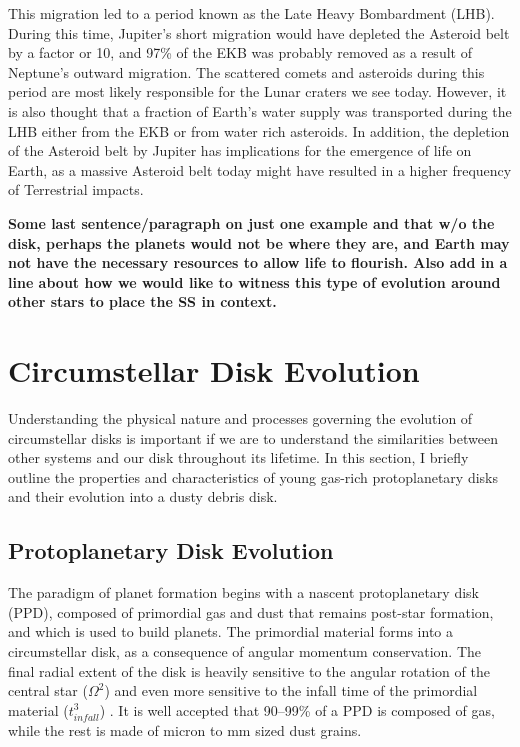     This migration led to a period known as the Late Heavy Bombardment (LHB). During this time, Jupiter's short migration would have depleted the Asteroid belt by a factor or 10, and 97\% of the EKB was probably removed as a result of Neptune's outward migration. The scattered comets and asteroids during this period are most likely responsible for the Lunar craters we see today\citep{Gomes2005}. However, it is also thought that a fraction of Earth's water supply was transported during the LHB either from the EKB or from water rich asteroids. In addition, the depletion of the Asteroid belt by Jupiter has implications for the emergence of life on Earth, as a massive Asteroid belt today might have resulted in a higher frequency of Terrestrial impacts. 
    
    \textbf{Some last sentence/paragraph on just one example and that w/o the disk, perhaps the planets would not be where they are, and Earth may not have the necessary resources to allow life to flourish. Also add in a line about how we would like to witness this type of evolution around other stars to place the SS in context.}
    

\section{Circumstellar Disk Evolution}
    
    Understanding the physical nature and processes governing the evolution of circumstellar disks is important if we are to understand the similarities between other systems and our disk throughout its lifetime. In this section, I briefly outline the properties and characteristics of young gas-rich protoplanetary disks and their evolution into a dusty debris disk.

    \subsection{Protoplanetary Disk Evolution}
    
    The paradigm of planet formation begins with a nascent protoplanetary disk (PPD), composed of primordial gas and dust that remains post-star formation, and which is used to build planets. The primordial material forms into a circumstellar disk, as a consequence of angular momentum conservation. The final radial extent of the disk is heavily sensitive to the angular rotation of the central star ($\Omega^2$) and even more sensitive to the infall time of the primordial material ($t_{infall}^3$) \citep{Terebey1984}. It is well accepted that 90--99\% of a PPD is composed of gas, while the rest is made of micron to mm sized dust grains.
    
